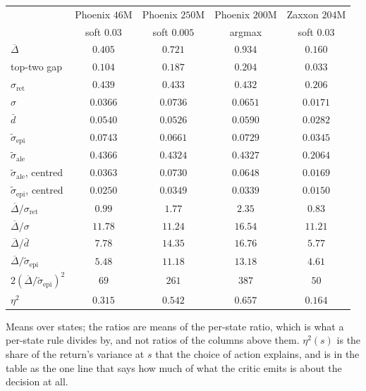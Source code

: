 \documentclass{article}
\newcommand{\gapbar}{\overline{\Delta}}
\newcommand{\dbar}{\bar{d}}
\newcommand{\sret}{\sigma_{\mathrm{ret}}}
\newcommand{\srank}{\sigma}
\begin{document}
\begin{center}
\small
\begin{tabular}{lcccc}
  \toprule
   & Phoenix $46$M & Phoenix $250$M & Phoenix $200$M & Zaxxon $204$M \\
   & soft $0.03$ & soft $0.005$ & argmax & soft $0.03$ \\
  \midrule
  $\gapbar$              & $0.405$  & $0.721$  & $0.934$  & $0.160$ \\
  top-two gap            & $0.104$  & $0.187$  & $0.204$  & $0.033$ \\
  $\sret$                & $0.439$  & $0.433$  & $0.432$  & $0.206$ \\
  $\srank$               & $0.0366$ & $0.0736$ & $0.0651$ & $0.0171$ \\
  $\dbar$                & $0.0540$ & $0.0526$ & $0.0590$ & $0.0282$ \\
  \midrule
  $\tilde\sigma_{\mathrm{epi}}$      & $0.0743$ & $0.0661$ & $0.0729$ & $0.0345$ \\
  $\tilde\sigma_{\mathrm{ale}}$      & $0.4366$ & $0.4324$ & $0.4327$ & $0.2064$ \\
  $\tilde\sigma_{\mathrm{ale}}$, centred & $0.0363$ & $0.0730$ & $0.0648$ & $0.0169$ \\
  $\tilde\sigma_{\mathrm{epi}}$, centred & $0.0250$ & $0.0349$ & $0.0339$ & $0.0150$ \\
  \midrule
  $\gapbar/\sret$        & $0.99$   & $1.77$   & $2.35$   & $0.83$ \\
  $\gapbar/\srank$       & $11.78$  & $11.24$  & $16.54$  & $11.21$ \\
  $\gapbar/\dbar$        & $7.78$   & $14.35$  & $16.76$  & $5.77$ \\
  $\gapbar/\tilde\sigma_{\mathrm{epi}}$ & $5.48$ & $11.18$ & $13.18$ & $4.61$ \\
  $2(\gapbar/\tilde\sigma_{\mathrm{epi}})^2$ & $69$ & $261$ & $387$ & $50$ \\
  $\eta^2$               & $0.315$  & $0.542$  & $0.657$  & $0.164$ \\
  \bottomrule
\end{tabular}
\end{center}

Means over states; the ratios are means of the per-state ratio, which is what a per-state rule
divides by, and not ratios of the columns above them. $\eta^2(s)$ is the share of the return's
variance at $s$ that the choice of action explains, and is in the table as the one line that says
how much of what the critic emits is about the decision at all.
\end{document}
